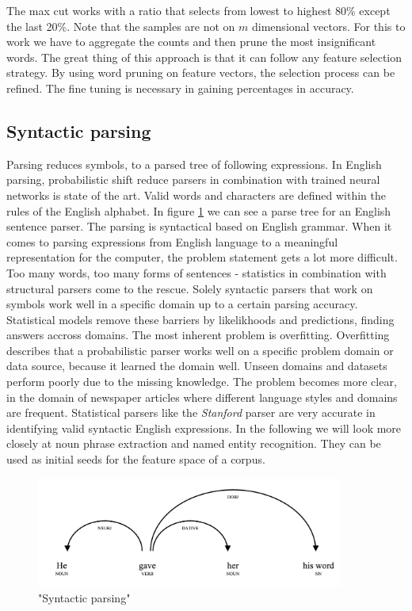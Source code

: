    The max cut works with a ratio that selects from lowest to highest 80\% except the last 20\%. Note that the samples are not on $m$ dimensional vectors. For this to work we have to aggregate the counts and then prune the most insignificant words. The great thing of this approach is that it can follow any feature selection strategy. By using word pruning on feature vectors, the selection process can be refined. The fine tuning is necessary in gaining percentages in accuracy.

  \subsection{Syntactic parsing}
  \label{sec:syntactic_parsing}

  Parsing reduces symbols, to a parsed tree of following expressions. In English parsing, probabilistic shift reduce parsers in combination with trained neural networks is state of the art. \cite{ShiftReduceParsingStanford} Valid words and characters are defined within the rules of the English alphabet. In figure \ref{syntactic_parsing} we can see a parse tree for an English sentence parser. The parsing is syntactical based on English grammar. When it comes to parsing expressions from English language to a meaningful representation for the computer, the problem statement gets a lot more difficult. Too many words, too many forms of sentences - statistics in combination with structural parsers come to the rescue. Solely syntactic parsers that work on symbols work well in a specific domain up to a certain parsing accuracy. Statistical models remove these barriers by likelikhoods and predictions, finding answers accross domains. The most inherent problem is overfitting. Overfitting describes that a probabilistic parser works well on a specific problem domain or data source, because it learned the domain well. Unseen domains and datasets perform poorly due to the missing knowledge. The problem becomes more clear, in the domain of newspaper articles where different language styles and domains are frequent. Statistical parsers like the \emph{Stanford} parser are very accurate in identifying valid syntactic English expressions. In the following we will look more closely at noun phrase extraction and named entity recognition. They can be used as initial seeds for the feature space of a corpus.

    \begin{figure}[h!]
      \centering
        \includegraphics[width=0.9\textwidth]{sentence_structure.png}
        \caption{"Syntactic parsing"}
        \label{syntactic_parsing}
    \end{figure} 


